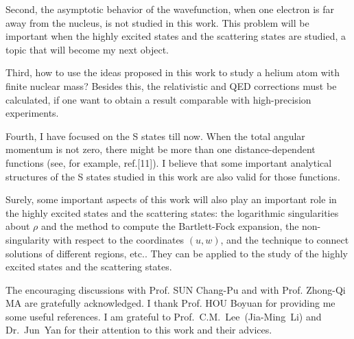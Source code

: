 Second, the asymptotic behavior of the wavefunction, when one electron is
far away from the nucleus, is not studied in this work. This problem
will be important when the highly excited states and the scattering states are
studied, a topic that will become my next object. 

Third, how to use the ideas proposed in this work to study a helium atom
with finite nuclear mass? Besides this, the relativistic and QED corrections
must be calculated, if one want to obtain a result comparable with
high-precision experiments.

Fourth, I have focused on the S states till now. When the total angular momentum
is not zero, there might be more than one distance-dependent functions (see, for
example, ref.[11]). I believe that some important analytical structures of the
S states studied in this work are also valid for those functions.

Surely, some important aspects of this work will also play an important
role in the highly excited states and the scattering states: the logarithmic
singularities about $\rho$ and the method to compute the Bartlett-Fock expansion,
the non-singularity with respect to the coordinates $(u,w)$, and the technique
to connect solutions of different regions, etc.. They can be applied
to the study of the highly excited states and the scattering states.

\vspace{5mm}

\noindent The encouraging discussions with Prof. SUN Chang-Pu and with
Prof. Zhong-Qi MA are gratefully
acknowledged. I thank Prof. HOU Boyuan for providing me some useful references.
I am grateful to Prof.~C.M.~Lee~(Jia-Ming~Li) and Dr.~Jun~Yan for
their attention to this work and their advices.

